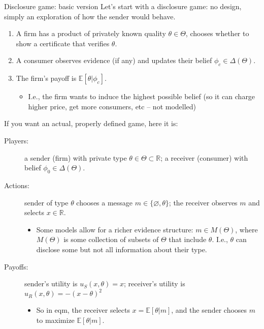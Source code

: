 \documentclass[english,10pt
,aspectratio=169
]{beamer}
\begin{document}
\begin{frame}{Disclosure game: basic version \citep{grossman_informational_1981}}
	Let's start with a \alert{disclosure game}: no design, simply an exploration of how the sender would behave.
	\begin{enumerate}[<+->]
		\item A firm has a product of privately known quality $\theta \in \Theta$, chooses whether to show a certificate that verifies $\theta$.
		
		\item A consumer observes evidence (if any) and updates their belief $\phi_c \in \varDelta(\Theta)$.
		
		\item The firm's payoff is $\mathbb{E}[\theta | \phi_c]$.
		\begin{itemize}
			\item I.e., the firm wants to induce the highest possible belief (so it can charge higher price, get more consumers, etc -- not modelled)
		\end{itemize}
	\end{enumerate}
\end{frame}


\begin{frame}
	If you want an actual, properly defined game, here it is:
	\begin{description}
		\item[Players:] a sender (firm) with private type $\theta \in \Theta \subset \mathbb{R}$; a receiver (consumer) with belief $\phi_0 \in \varDelta(\Theta)$.
		\item[Actions:] sender of type $\theta$ chooses a message $m \in \{\varnothing, \theta\}$; the receiver observes $m$ and selects $x \in \mathbb{R}$.
		\begin{itemize}
			\item Some models allow for a richer evidence structure: $m \in M(\Theta)$, where $M(\Theta)$ is some collection of subsets of $\Theta$ that include $\theta$. I.e., $\theta$ can disclose some but not all information about their type. \citep{milgrom_good_1981}
		\end{itemize}
		\item[Payoffs:] sender's utility is $u_S(x,\theta) = x$; receiver's utility is $u_R(x,\theta) = -(x-\theta)^2$
		\begin{itemize}
			\item So in eqm, the receiver selects $x = \mathbb{E}[\theta|m]$, and the sender chooses $m$ to maximize $\mathbb{E}[\theta|m]$.
		\end{itemize}
	\end{description}
\end{frame}
\end{document}
